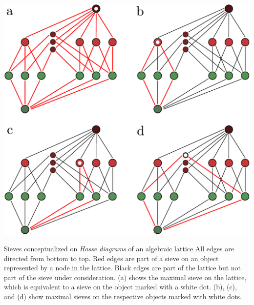 \begin{frame}
\centering\includegraphics[width=0.4\framewidth]{fig/sieveHasseNoNum.pdf}
\begin{block}{Sieves conceptualized on {\it Hasse diagrams} of an algebraic lattice}
All edges are directed from bottom to top. Red edges are part of a sieve on an object represented by a node in the lattice. Black edges are part of the lattice but not part of the sieve under consideration. (a) shows the maximal sieve on the lattice, which is equivalent to a sieve on the object marked with a white dot. (b), (c), and (d) show maximal sieves on the respective objects marked with white dots.
\end{block}
\end{frame}